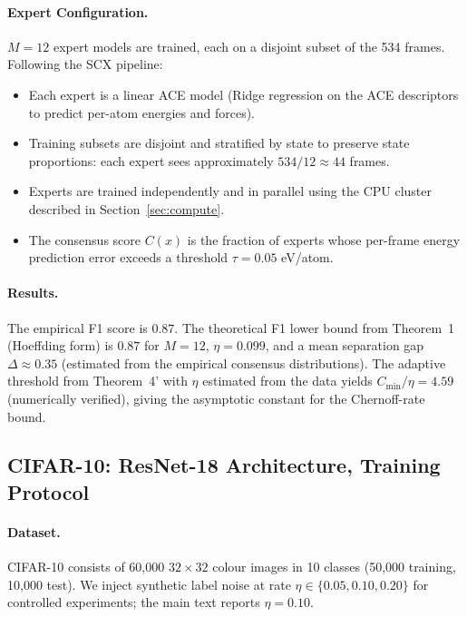 \paragraph{Expert Configuration.}
$M = 12$ expert models are trained, each on a disjoint subset of the 534 frames. Following the SCX pipeline:
\begin{itemize}
    \item Each expert is a linear ACE model (Ridge regression on the ACE descriptors to predict per-atom energies and forces).
    \item Training subsets are disjoint and stratified by state to preserve state proportions: each expert sees approximately $534 / 12 \approx 44$ frames.
    \item Experts are trained independently and in parallel using the CPU cluster described in Section~\ref{sec:compute}.
    \item The consensus score $C(x)$ is the fraction of experts whose per-frame energy prediction error exceeds a threshold $\tau = 0.05$ eV/atom.
\end{itemize}

\paragraph{Results.}
The empirical F1 score is $0.87$. The theoretical F1 lower bound from Theorem~1 (Hoeffding form) is $0.87$ for $M=12$, $\eta=0.099$, and a mean separation gap $\Delta \approx 0.35$ (estimated from the empirical consensus distributions). The adaptive threshold from Theorem~4' with $\eta$ estimated from the data yields $C_{\min}/\eta = 4.59$ (numerically verified), giving the asymptotic constant for the Chernoff-rate bound.

\subsection{CIFAR-10: ResNet-18 Architecture, Training Protocol}

\paragraph{Dataset.}
CIFAR-10 consists of 60,000 $32 \times 32$ colour images in 10 classes (50,000 training, 10,000 test). We inject synthetic label noise at rate $\eta \in \{0.05, 0.10, 0.20\}$ for controlled experiments; the main text reports $\eta = 0.10$.

